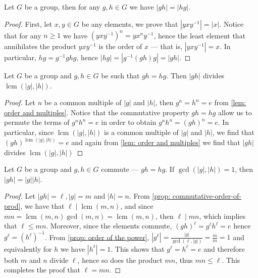 \begin{proposition}\label{prop: order-prod-commutes}
    Let \(G\) be a group, then for any \(g, h \in G\) we have \(|gh| = |hg|\).
\end{proposition}

\begin{proof}
    First, let \(x, y \in G\) be any elements, we prove that \(|y x y^{-1}| =
    |x|\). Notice that for any \(n \geq 1\) we have \((y x y^{-1})^n = y x^n
    y^{-1}\), hence the least element that annihilates the product \(y x y^{-1}\)
    is the order of \(x\) --- that is, \(|y x y^{-1}| = x\). In particular, \(hg =
    g^{-1} gh g\), hence \(|hg| = |g^{-1} (gh) g| = |gh|\).
\end{proof}

\begin{proposition}\label{prop: commutative-order-of-prod}
    Let \(G\) be a group and \(g, h \in G\) be such that \(g h = h g\). Then \(|g
    h|\) divides \(\operatorname{lcm}(|g|, |h|)\).
\end{proposition}

\begin{proof}
    Let \(n\) be a common multiple of \(|g|\) and \(|h|\), then \(g^n = h^n = e\)
    from \cref{lem: order and multiples}. Notice that the commutative property \(g
    h = h g\) allow us to permute the terms of \(g^n h^n = e\) in order to obtain
    \(g^n h^n = (g h)^n = e\). In particular, since \(\operatorname{lcm}(|g|,
    |h|)\) is a common multiple of \(|g|\) and \(|h|\), we find that \((g
    h)^{\operatorname{lcm}(|g|, |h|)} = e\) and again from \cref{lem: order and
        multiples} we find that \(|g h|\) divides \(\operatorname{lcm}(|g|, |h|)\)
\end{proof}

\begin{lemma}\label{lem: ord-prod-rel-prime}
    Let \(G\) be a group and \(g, h \in G\) commute --- \(gh = hg\). If
    \(\operatorname{gcd}(|g|, |h|) = 1\), then \(|gh| = |g| |h|\).
\end{lemma}

\begin{proof}
    Let \(|gh| = \ell, |g| = m\) and \(|h| = n\). From \cref{prop:
        commutative-order-of-prod}, we have that \(\ell \mid \operatorname{lcm}(m,
    n)\), and since \(m n = \operatorname{lcm}(m, n) \operatorname{gcd}(m, n) =
    \operatorname{lcm}(m, n)\), then \(\ell \mid mn\), which implies that \(\ell
    \leq mn\). Moreover, since the elements commute, \((g h)^\ell = g^\ell h^\ell
    = e\) hence \(g^\ell = (h^\ell)^{-1}\). From \cref{prop: order of the power},
    \(|g^\ell| = \frac{|g|}{\operatorname{gcd}(\ell, |g|)} = \frac m m = 1 \) and
    equivalently for \(h\) we have \(|h^\ell| = 1\). This shows that \(g^\ell =
    h^\ell = e\) and therefore both \(m\) and \(n\) divide \(\ell\), hence so does
    the product \(mn\), thus \(mn \leq \ell\). This completes the proof that
    \(\ell = mn\).
\end{proof}

